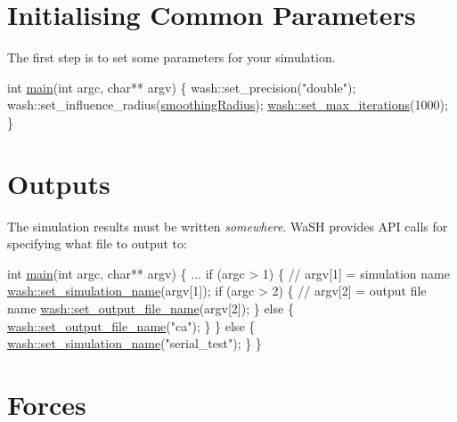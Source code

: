 \section*{Initialising Common Parameters}

The first step is to set some parameters for your simulation.


\begin{DoxyCode}
\textcolor{keywordtype}{int} \mbox{\hyperlink{3d__fluid__sim_2fluid__sim_8cpp_a3c04138a5bfe5d72780bb7e82a18e627}{main}}(\textcolor{keywordtype}{int} argc, \textcolor{keywordtype}{char}** argv) \{
    wash::set\_precision(\textcolor{stringliteral}{"double"});
    wash::set\_influence\_radius(\mbox{\hyperlink{3d__fluid__sim_2fluid__sim_8cpp_aeb9760a781fb6ccf134ed4353c9888e5}{smoothingRadius}});
    \mbox{\hyperlink{namespacewash_aeb7b287406244c8ab192d0524ad4da5b}{wash::set\_max\_iterations}}(1000);
\}
\end{DoxyCode}


\section*{Outputs}

The simulation results must be written {\itshape somewhere}. Wa\+SH provides A\+PI calls for specifying what file to output to\+: 
\begin{DoxyCode}
\textcolor{keywordtype}{int} \mbox{\hyperlink{3d__fluid__sim_2fluid__sim_8cpp_a3c04138a5bfe5d72780bb7e82a18e627}{main}}(\textcolor{keywordtype}{int} argc, \textcolor{keywordtype}{char}** argv) \{
    ...
    \textcolor{keywordflow}{if} (argc > 1) \{
        \textcolor{comment}{// argv[1] = simulation name}
        \mbox{\hyperlink{namespacewash_a4ddbab848bef96e0fc69bf8e280d4775}{wash::set\_simulation\_name}}(argv[1]);
        \textcolor{keywordflow}{if} (argc > 2) \{
            \textcolor{comment}{// argv[2] = output file name}
            \mbox{\hyperlink{namespacewash_ad6de17b9a27f58f6245a68ede303e84b}{wash::set\_output\_file\_name}}(argv[2]);
        \} \textcolor{keywordflow}{else} \{
            \mbox{\hyperlink{namespacewash_ad6de17b9a27f58f6245a68ede303e84b}{wash::set\_output\_file\_name}}(\textcolor{stringliteral}{"ca"});
        \}
    \} \textcolor{keywordflow}{else} \{
        \mbox{\hyperlink{namespacewash_a4ddbab848bef96e0fc69bf8e280d4775}{wash::set\_simulation\_name}}(\textcolor{stringliteral}{"serial\_test"});
    \}
\}
\end{DoxyCode}


\section*{Forces}

